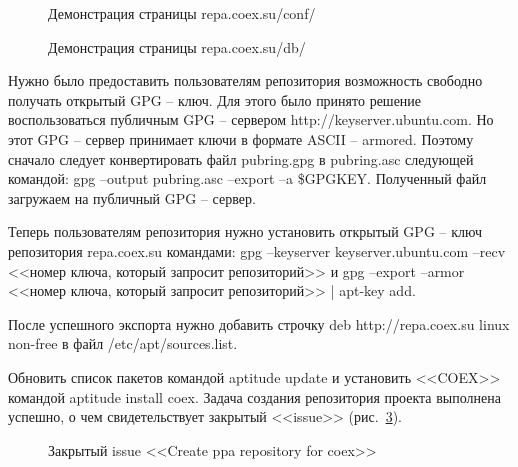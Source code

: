 \begin{figure}[h!]
\caption{ Демонстрация страницы repa.coex.su/conf/ }
\label{kucher_8:kucher_8}
\end{figure}
	
\begin{figure}[h!]
\caption{ Демонстрация страницы repa.coex.su/db/ }
\label{kucher_9:kucher_9}
\end{figure}
	
	
Нужно было предоставить пользователям репозитория возможность свободно получать открытый GPG – ключ. Для этого было принято решение воспользоваться публичным GPG – сервером http://keyserver.ubuntu.com. Но этот GPG – сервер принимает ключи в формате ASCII – armored. Поэтому сначало следует конвертировать файл pubring.gpg в pubring.asc следующей командой: gpg –output pubring.asc –export –a \$GPGKEY. Полученный файл загружаем на публичный GPG – сервер.~\cite{nixp} 

Теперь пользователям репозитория нужно установить открытый GPG – ключ репозитория repa.coex.su командами: gpg --keyserver keyserver.ubuntu.com --recv <<номер ключа, который запросит репозиторий>> и gpg --export --armor <<номер ключа, который запросит репозиторий>> | apt-key add.

После успешного экспорта нужно добавить строчку deb http://repa.coex.su linux non-free в файл /etc/apt/sources.list.

Обновить список пакетов командой aptitude update и установить <<COEX>> командой aptitude install coex. Задача создания репозитория проекта выполнена успешно, о чем свидетельствует закрытый <<issue>> (рис.~\ref{kucher_10:kucher_10}).
	
\begin{figure}[h!]
\caption{ Закрытый issue <<Create ppa repository for coex>> }
\label{kucher_10:kucher_10}
\end{figure}


\clearpage





